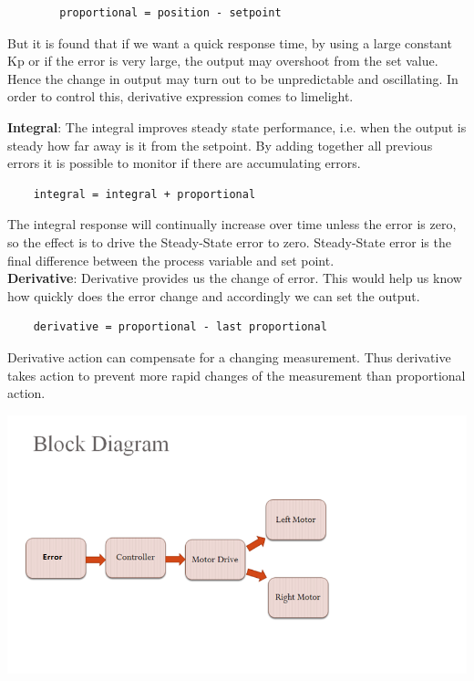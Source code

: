 \documentclass[report]{res}
\begin{document}
\begin{itemize}
	\begin{lstlisting}
		proportional = position - setpoint
	\end{lstlisting}
	
	\qquad But it is found that if we want a quick response time, by using a large constant Kp or  if the error is very large, the output may overshoot from the set value. Hence the change in output may turn out to be unpredictable and oscillating. In order to control this, derivative expression comes to limelight.
	
	\textbf{Integral}: The integral improves steady state performance, i.e. when the output is steady how far away is it from the setpoint. By adding together all previous errors it is possible to monitor if there are accumulating errors.
	
	\begin{lstlisting}
	integral = integral + proportional
	\end{lstlisting} 
	
	The integral response will continually increase over time unless the error is zero, so the effect is to drive the Steady-State error to zero. Steady-State error is the final difference between the process variable and set point.\\ 
	
	\textbf{Derivative}: Derivative provides us the change of error. This would help us know how quickly does the error change and accordingly we can set the output.
	
	\begin{lstlisting}
	derivative = proportional - last proportional
	\end{lstlisting}
	
	Derivative action can compensate for a changing measurement. Thus derivative takes action to prevent more rapid changes of the measurement than proportional action.
	\\
	
	\begin{center}
	\includegraphics[scale = 1]{graphics/pid.png}
	\end{center}	
	
	\end{itemize}
	
\end{document}
